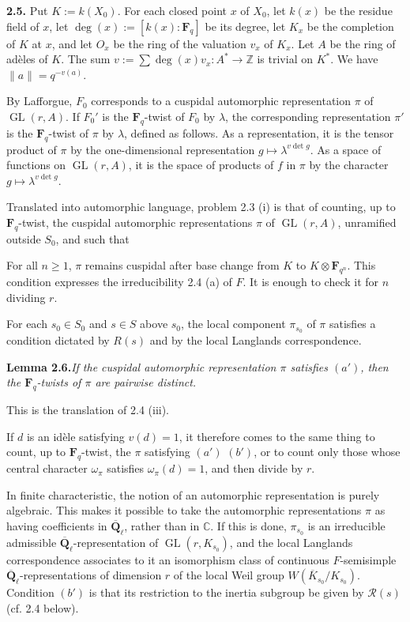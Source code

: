 \documentclass[11pt]{article}
\newcommand{\Fq}{\mathbf{F}_q}
\newcommand{\Fqn}{\mathbf{F}_{q^n}}
\newcommand{\Qbl}{\overline{\mathbf{Q}}_{\ell}}
\newcommand{\GL}{\operatorname{GL}}
\newcommand{\Z}{\mathbb{Z}}
\newcommand{\C}{\mathbb{C}}
\newcommand{\Rcal}{\mathcal{R}}
\newcommand{\para}[1]{\medskip\noindent\textbf{#1}\enspace}
\begin{document}
\para{2.5.} Put \(K:=k(X_0)\). For each closed point \(x\) of \(X_0\), let \(k(x)\) be the residue field of \(x\), let \(\deg(x):=[k(x):\Fq]\) be its degree, let \(K_x\) be the completion of \(K\) at \(x\), and let \(O_x\) be the ring of the valuation \(v_x\) of \(K_x\). Let \(A\) be the ring of adèles of \(K\). The sum \(v:=\sum \deg(x)v_x:A^*\to\Z\) is trivial on \(K^*\). We have \(\|a\|=q^{-v(a)}\).

By Lafforgue, \(F_0\) corresponds to a cuspidal automorphic representation \(\pi\) of \(\GL(r,A)\). If \(F_0'\) is the \(\Fq\)-twist of \(F_0\) by \(\lambda\), the corresponding representation \(\pi'\) is the \(\Fq\)-twist of \(\pi\) by \(\lambda\), defined as follows. As a representation, it is the tensor product of \(\pi\) by the one-dimensional representation \(g\mapsto\lambda^{v\det g}\). As a space of functions on \(\GL(r,A)\), it is the space of products of \(f\) in \(\pi\) by the character \(g\mapsto\lambda^{v\det g}\).

Translated into automorphic language, problem 2.3 (i) is that of counting, up to \(\Fq\)-twist, the cuspidal automorphic representations \(\pi\) of \(\GL(r,A)\), unramified outside \(S_0\), and such that
\begin{description}[leftmargin=2.5em,style=nextline]
\item[\((a')\)] For all \(n\ge 1\), \(\pi\) remains cuspidal after base change from \(K\) to \(K\otimes\Fqn\). This condition expresses the irreducibility 2.4 (a) of \(F\). It is enough to check it for \(n\) dividing \(r\).
\item[\((b')\)] For each \(s_0\in S_0\) and \(s\in S\) above \(s_0\), the local component \(\pi_{s_0}\) of \(\pi\) satisfies a condition dictated by \(R(s)\) and by the local Langlands correspondence.
\end{description}

\noindent\textbf{Lemma 2.6.}\quad\textit{If the cuspidal automorphic representation \(\pi\) satisfies \((a')\), then the \(\Fq\)-twists of \(\pi\) are pairwise distinct.}

This is the translation of 2.4 (iii).

If \(d\) is an idèle satisfying \(v(d)=1\), it therefore comes to the same thing to count, up to \(\Fq\)-twist, the \(\pi\) satisfying \((a')\) \((b')\), or to count only those whose central character \(\omega_\pi\) satisfies \(\omega_\pi(d)=1\), and then divide by \(r\).

In finite characteristic, the notion of an automorphic representation is purely algebraic. This makes it possible to take the automorphic representations \(\pi\) as having coefficients in \(\Qbl\), rather than in \(\C\). If this is done, \(\pi_{s_0}\) is an irreducible admissible \(\Qbl\)-representation of \(\GL(r,K_{s_0})\), and the local Langlands correspondence associates to it an isomorphism class of continuous \(F\)-semisimple \(\Qbl\)-representations of dimension \(r\) of the local Weil group \(W(\overline K_{s_0}/K_{s_0})\). Condition \((b')\) is that its restriction to the inertia subgroup be given by \(\Rcal(s)\) (cf. 2.4 below).
\end{document}
